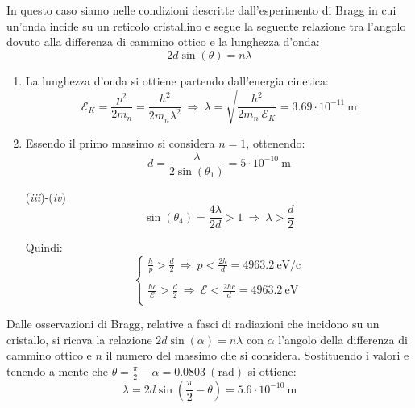 \documentclass[12pt,twoside,a4]{article}
\begin{document}
\begin{solution}
	In questo caso siamo nelle condizioni descritte dall'esperimento di Bragg in cui un'onda incide su un reticolo cristallino e segue la seguente relazione tra l'angolo dovuto alla differenza di cammino ottico e la lunghezza d'onda: \begin{equation*}
2 d \sin{(\theta)} = n\lambda    
\end{equation*}      

\begin{enumerate}[label=(\textit{\roman*})]
\item  La lunghezza d'onda si ottiene partendo dall'energia cinetica: \begin{equation*}
 \mathcal{E}_K = \frac{p^2}{2 m_n} = \frac{h^2}{2 m_n \lambda^2}  \  \Rightarrow   \  \lambda = \sqrt{\frac{h^2}{2 m_n \ \mathcal{E}_K}} = 3.69 \cdot 10^{-11} \ \mathrm{m} 
\end{equation*}
    
\item  Essendo il primo massimo si considera $n = 1$, ottenendo: \begin{equation*}
 d = \frac{\lambda}{2 \sin{(\theta_1)}} = 5 \cdot 10^{-10} \ \mathrm{m}    
\end{equation*}    

\item[(\textit{iii})-(\textit{iv})] \begin{equation*}
 \sin{(\theta_4)} = \frac{4 \lambda}{2 d} > 1  \  \Rightarrow  \  \lambda > \frac{d}{2}   
\end{equation*}
       
       Quindi: 
       \begin{equation*}
   \begin{cases}
   \frac{h}{p} >  \frac{ d}{2}  \  \Rightarrow  \  p < \frac{2 h}{d} = 4963.2 \ \mathrm{eV/c} \\
   \\
   \frac{h c}{\mathcal{E}} >  \frac{d}{2}  \  \Rightarrow  \  \mathcal{E} < \frac{2 h c }{ d } = 4963.2 \ \mathrm{eV}  \\
   \end{cases} 
       \end{equation*}
       
\end{enumerate}
\end{solution}


\newpage
\begin{solution}
	Dalle osservazioni di Bragg, relative a fasci di radiazioni che incidono su un cristallo, si ricava la relazione $2d \sin{(\alpha)} = n\lambda$ con $\alpha$ l'angolo della differenza di cammino ottico e $n$ il numero del massimo che si considera. Sostituendo i valori e tenendo a mente che $\theta = \frac{\pi}{2} - \alpha = 0.0803 \ \mathrm{(rad)}$ si ottiene: 
 \begin{equation*}
     \lambda = 2d \sin{(\frac{\pi}{2} - \theta)} = 5.6 \cdot 10^{-10} \ \mathrm{m} 
 \end{equation*}
\end{solution}
\end{document}
